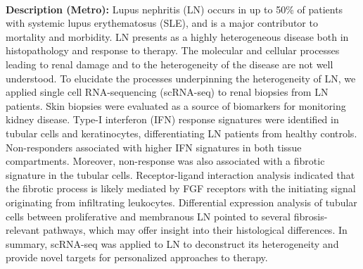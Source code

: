 \documentclass[times, twoside, watermark]{zHenriquesLab-StyleBioRxiv}
\begin{document}
\begin{enumerate}
			\\ \textbf{Description (Metro):}
			Lupus nephritis (LN) occurs in up to 50\% of patients with systemic lupus erythematosus (SLE), and is a major contributor to mortality and morbidity. LN presents as a highly heterogeneous disease both in histopathology and response to therapy. The molecular and cellular processes leading to renal damage and to the heterogeneity of the disease are not well understood. To elucidate the processes underpinning the heterogeneity of LN, we applied single cell RNA-sequencing (scRNA-seq) to renal biopsies from LN patients. Skin biopsies were evaluated as a source of biomarkers for monitoring kidney disease. Type-I interferon (IFN) response signatures were identified in tubular cells and keratinocytes, differentiating LN patients from healthy controls. Non-responders associated with higher IFN signatures in both tissue compartments. Moreover, non-response was also associated with a fibrotic signature in the tubular cells. Receptor-ligand interaction analysis indicated that the fibrotic process is likely mediated by FGF receptors with the initiating signal originating from infiltrating leukocytes. Differential expression analysis of tubular cells between proliferative and membranous LN pointed to several fibrosis-relevant pathways, which may offer insight into their histological differences. In summary, scRNA-seq was applied to LN to deconstruct its heterogeneity and provide novel targets for personalized approaches to therapy.
\end{enumerate}
\end{document}
